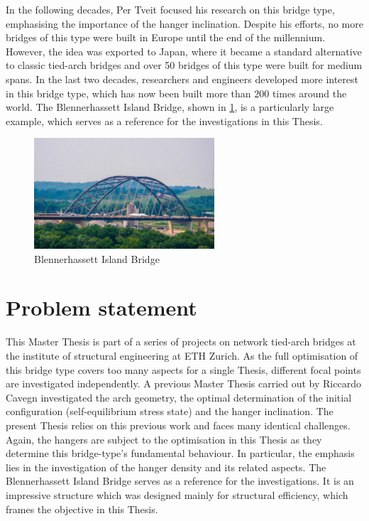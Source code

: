 In the following decades, Per Tveit focused his research on this bridge type, emphasising the importance of the hanger inclination. Despite his efforts, no more bridges of this type were built in Europe until the end of the millennium. However, the idea was exported to Japan, where it became a standard alternative to classic tied-arch bridges and over 50 bridges of this type were built for medium spans. In the last two decades, researchers and engineers developed more interest in this bridge type, which has now been built more than 200 times around the world. The Blennerhassett Island Bridge, shown in \cref{fig:Blennerhassett}, is a particularly large example, which serves as a reference for the investigations in this Thesis.

\begin{figure}[H]
    \centering
    \includegraphics[width=0.6\textwidth]{overleaf/Pictures/Blennerhassett.jpg}
    \caption{Blennerhassett Island Bridge \cite{Blennerhassett}}
    \label{fig:Blennerhassett}
\end{figure}

\section{Problem statement} \label{sec:int_prob}
This Master Thesis is part of a series of projects on network tied-arch bridges at the institute of structural engineering at ETH Zurich. As the full optimisation of this bridge type covers too many aspects for a single Thesis, different focal points are investigated independently. A previous Master Thesis carried out by Riccardo Cavegn investigated the arch geometry, the optimal determination of the initial configuration (self-equilibrium stress state) and the hanger inclination. The present Thesis relies on this previous work and faces many identical challenges. Again, the hangers are subject to the optimisation in this Thesis as they determine this bridge-type's fundamental behaviour. In particular, the emphasis lies in the investigation of the hanger density and its related aspects. The Blennerhassett Island Bridge serves as a reference for the investigations. It is an impressive structure which was designed mainly for structural efficiency, which frames the objective in this Thesis.  

